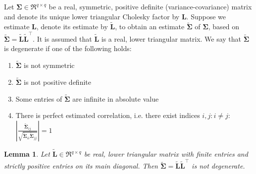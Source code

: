 \documentclass[11pt, a4paper]{article}
\newcommand*{\bb}{\boldsymbol}
\theoremstyle{example} \newtheorem{example}{Example}[section]
\theoremstyle{theorem} \newtheorem{theorem}{Theorem}[section]
\theoremstyle{theorem }\newtheorem{proposition}{Proposition}[section]
\theoremstyle{theorem }\newtheorem{corollary}{Corollary}[section]
\newtheorem{lemma}[theorem]{Lemma}
\begin{document}
Let $\bb \Sigma \in \Re^{q \times q}$ be a real, symmetric, positive definite (variance-covariance) matrix and denote its unique lower triangular Cholesky factor by $\bb L$. Suppose we estimate $\bb L$, denote its estimate by $\tilde{\bb L}$, to obtain an estimate $\tilde{\bb \Sigma}$ of $\bb \Sigma$, based on $\tilde{\bb \Sigma} = \tilde{\bb L}\tilde{\bb L}^\top$. It is assumed that $\tilde{\bb L}$ is a real, lower triangular matrix. We say that $\tilde{\bb \Sigma}$ is degenerate if one of the following holds: 
\begin{enumerate}[label=S\arabic{*})]
	\item $\tilde{\bb \Sigma}$ is not symmetric
	\item $\tilde{\bb \Sigma}$ is not positive definite 
	\item Some entries of $\tilde{\bb \Sigma}$ are infinite in absolute value 
	\item There is perfect estimated correlation, i.e. there exist indices $i,j: i \neq j$: $\left|\frac{\tilde{\bb \Sigma}_{ij} }{\sqrt{ \tilde{\bb \Sigma}_{ii} \tilde{\bb \Sigma}_{jj}}}\right|=1$ 
\end{enumerate}
\begin{lemma} \label{lemma:nondeg}
	Let $\tilde{\bb L} \in \Re^{q \times q}$ be real, lower triangular matrix with finite entries and strictly positive entries on its main diagonal. Then $\tilde{\bb \Sigma} = \tilde{\bb L}\tilde{\bb L}^\top$ is not degenerate. 
\end{lemma}
\end{document}
